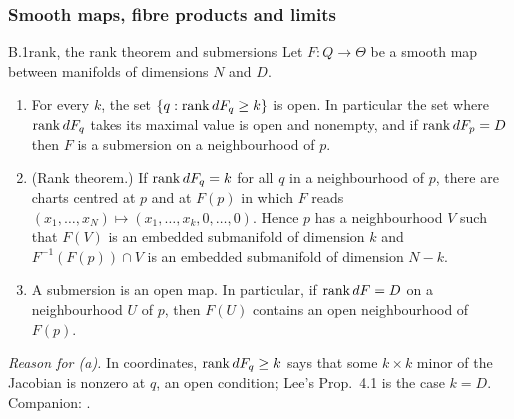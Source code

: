 \subsubsection{Smooth maps, fibre products and limits}

\begin{auxresult}{B.1}{rank, the rank theorem and submersions}{\citep[Prop.~4.1, Thm~4.12, Prop.~4.28,
Thm~5.12]{xlee2013introduction}}
Let $F:Q\to\Theta$ be a smooth map between manifolds of dimensions $N$ and $D$.
\begin{enumerate}[label=(\alph*)]
  \item For every $k$, the set $\{q:\operatorname{rank} dF_q\ge k\}$ is open. In particular the set where $\operatorname{rank} dF_q$ takes its maximal
    value is open and nonempty, and if $\operatorname{rank} dF_p=D$ then $F$ is a submersion on a neighbourhood of $p$.
  \item (Rank theorem.) If $\operatorname{rank} dF_q=k$ for all $q$ in a neighbourhood of $p$, there are charts centred at $p$ and at
    $F(p)$ in which $F$ reads $(x_1,\dots,x_N)\mapsto(x_1,\dots,x_k,0,\dots,0)$. Hence $p$ has a neighbourhood $V$ such
    that $F(V)$ is an embedded submanifold of dimension $k$ and $F^{-1}(F(p))\cap V$ is an embedded submanifold of
    dimension $N-k$.
  \item A submersion is an open map. In particular, if $\operatorname{rank} dF=D$ on a neighbourhood $U$ of $p$, then $F(U)$ contains
    an open neighbourhood of $F(p)$.
\end{enumerate}
\end{auxresult}
\noindent\emph{Reason for (a).} In coordinates, $\operatorname{rank} dF_q\ge k$ says that some $k\times k$ minor of the Jacobian is
nonzero at $q$, an open condition; Lee's Prop.~4.1 is the case $k=D$. Companion: .

